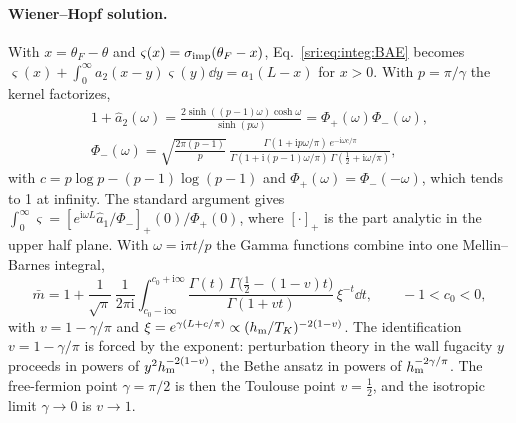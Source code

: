 \paragraph{Wiener--Hopf solution.} With $x=\theta_F-\theta$ and $\varsigma(x)=\sigma_{\rm imp}(\theta_F-x)$,
Eq.~\eqref{sri:eq:integ:BAE} becomes $\varsigma(x)+\int_0^\infty a_2(x-y)\varsigma(y)\dd y=a_1(L-x)$ for $x>0$. With
$p=\pi/\gamma$ the kernel factorizes,
\begin{equation}
\begin{gathered}
 1+\hat a_2(\omega)=\frac{2\sinh((p-1)\omega)\cosh\omega}{\sinh(p\omega)}=\Phi_+(\omega)\Phi_-(\omega),\\
 \Phi_-(\omega)=\sqrt{\frac{2\pi(p-1)}{p}}\,
 \frac{\Gamma(1+\mathrm ip\omega/\pi)\,e^{-\mathrm i\omega c/\pi}}{\Gamma(1+\mathrm i(p-1)\omega/\pi)\,
 \Gamma(\frac12+\mathrm i\omega/\pi)},
\end{gathered}
\end{equation}
with $c=p\log p-(p-1)\log(p-1)$ and $\Phi_+(\omega)=\Phi_-(-\omega)$, which tends to 1 at infinity. The standard
argument gives $\int_0^\infty\varsigma=[e^{\mathrm i\omega L}\hat a_1/\Phi_-]_+(0)/\Phi_+(0)$, where $[\cdot]_+$ is
the part analytic in the upper half plane. With $\omega=\mathrm i\pi t/p$ the Gamma functions combine into one
Mellin--Barnes integral,
\begin{equation}
 \bar m=1+\frac1{\sqrt\pi}\,\frac1{2\pi\mathrm i}\int_{c_0-\mathrm i\infty}^{c_0+\mathrm i\infty}
 \frac{\Gamma(t)\,\Gamma\bigl(\frac12-(1-v)t\bigr)}{\Gamma(1+vt)}\,\xi^{-t}\dd t,\qquad -1<c_0<0,
 \label{sri:eq:integ:MB}
\end{equation}
with $v=1-\gamma/\pi$ and $\xi=e^{\gamma(L+c/\pi)}\propto(h_{\rm m}/T_K)^{-2(1-v)}$. The identification
$v=1-\gamma/\pi$ is forced by the exponent: perturbation theory in the wall fugacity $y$ proceeds in powers of
$y^2h_{\rm m}^{-2(1-v)}$, the Bethe ansatz in powers of $h_{\rm m}^{-2\gamma/\pi}$. The free-fermion point
$\gamma=\pi/2$ is then the Toulouse point $v=\frac12$, and the isotropic limit $\gamma\to0$ is $v\to1$.

